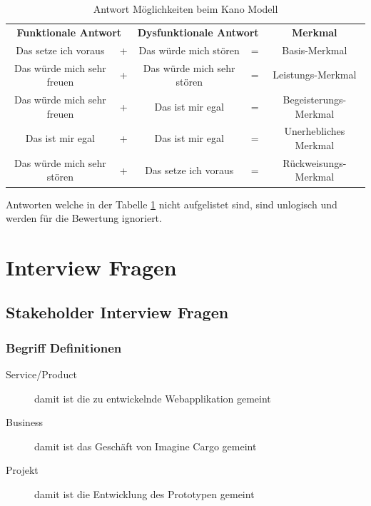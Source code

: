 \begin{table}[h!]
\centering
\label{tbl:kanoantworten}
\begin{tabular}{clclc}
\multicolumn{2}{c}{\textbf{Funktionale Antwort}} & \multicolumn{2}{c}{\textbf{Dysfunktionale Antwort}} & \textbf{Merkmal}      \\
Das setze ich voraus                & +          & Das würde mich stören                 & =           & Basis-Merkmal         \\
Das würde mich sehr freuen          & +          & Das würde mich sehr stören            & =           & Leistungs-Merkmal     \\
Das würde mich sehr freuen          & +          & Das ist mir egal                      & =           & Begeisterungs-Merkmal \\
Das ist mir egal                    & +          & Das ist mir egal                      & =           & Unerhebliches Merkmal \\
Das würde mich sehr stören          & +          & Das setze ich voraus                  & =           & Rückweisungs-Merkmal
\end{tabular}
\caption{Antwort Möglichkeiten beim Kano Modell}
\end{table}

Antworten welche in der Tabelle \ref{tbl:kanoantworten} nicht aufgelistet sind, sind unlogisch und werden für die Bewertung ignoriert.

\newpage{}
\section{Interview Fragen}
\subsection{Stakeholder Interview Fragen}
\label{subsec:stakeholderfragen}
\subsubsection{Begriff Definitionen}
\begin{description}
  \item[Service/Product] damit ist die zu entwickelnde Webapplikation gemeint
  \item[Business] damit ist das Geschäft von Imagine Cargo gemeint
  \item[Projekt] damit ist die Entwicklung des Prototypen gemeint
\end{description}

